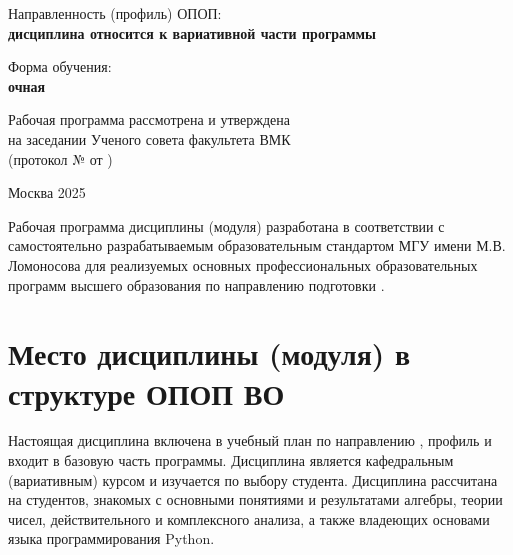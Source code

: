 \documentclass[a4paper, 12pt]{article}
\begin{document}
\begin{titlepage}
    \vspace{16pt}

    Направленность (профиль) ОПОП:\\
    \textbf{дисциплина относится к вариативной части программы }

    \vspace{16pt}

    Форма обучения:\\
    \textbf{очная}

    \vspace{48pt}

    \begin{flushright}

        Рабочая программа рассмотрена и утверждена\\
        на заседании  Ученого совета факультета ВМК\\
        (протокол №\underline{\hspace{0.5cm}} от \underline{\hspace{3cm}})

    \end{flushright}

    \vspace*{\fill}

    Москва 2025

\end{titlepage}

Рабочая программа дисциплины (модуля) разработана в соответствии с самостоятельно разрабатываемым образовательным стандартом МГУ имени М.В. Ломоносова для реализуемых основных профессиональных образовательных программ высшего образования по направлению подготовки .

\newpage

\tableofcontents

\newpage

\section{Место дисциплины (модуля) в структуре ОПОП ВО}

Настоящая дисциплина включена в учебный план по направлению , профиль  и входит в базовую часть программы.
Дисциплина является кафедральным (вариативным)  курсом и изучается по выбору студента.
Дисциплина рассчитана на студентов, знакомых с основными понятиями и результатами алгебры, теории чисел, действительного и комплексного анализа, а также владеющих основами языка программирования Python.
\end{document}
